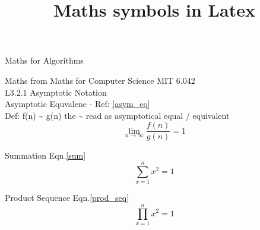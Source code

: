 \documentclass{article}		%
\title{Maths symbols in Latex}
\begin{document}
\begin{Huge}
Maths for Algorithms\\
\end{Huge}


\begin{large}
Maths from Maths for Computer Science MIT 6.042\\

L3.2.1 Asymptotic Notation\\

Asymptotic Equvalene - Ref: \ref{asym_eq}\\

Def: f(n) \~{} g(n)  {} the \~{} read as asymptotical equal / equivalent  \\  
  \begin{equation}
	\lim_{n\to\infty}\frac{f(n)}{g(n)} = 1
  	\label{asym_eq}
  \end{equation} 




Summation Eqn.\ref{sum}
  \begin{equation}
	\sum_{x=1}^{n}x^2=1
	\label{sum}	
  \end{equation}   
  
Product Sequence Eqn.\ref{prod_seq}
  \begin{equation}
	\prod_{x=1}^{n}x^2=1
	\label{prod_seq}	
  \end{equation}   

\end{large}
\end{document}

